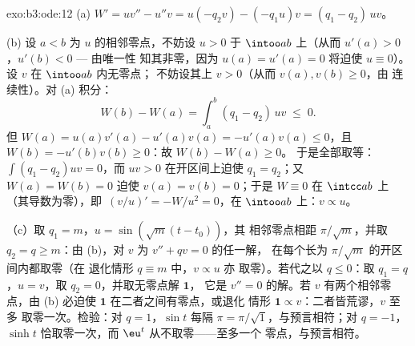 \begin{solution}{exo:b3:ode:12}
(a) $W' = uv'' - u''v = u(-q_2v) - (-q_1u)v = (q_1 -
q_2)\,uv$。

(b) 设 $a < b$ 为 $u$ 的相邻零点，不妨设 $u >
0$ 于 $\intoo ab$ 上（从而 $u'(a) > 0$，$u'(b) < 0$ --- 由唯一性
知其非零，因为 $u(a) = u'(a) = 0$ 将迫使 $u
\equiv 0$）。设 $v$ 在 $\intoo ab$ 内无零点；
不妨设其上 $v > 0$（从而 $v(a), v(b) \geq 0$，由
连续性）。对 (a) 积分：
\[
W(b) - W(a) = \int_a^b(q_1 - q_2)\,uv \;\leq\; 0 .
\]
但 $W(a) = u(a)v'(a) - u'(a)v(a) = -u'(a)v(a) \leq 0$，且
$W(b) = -u'(b)v(b) \geq 0$：故 $W(b) - W(a) \geq 0$。
于是全部取等：$\int(q_1 - q_2)uv = 0$，而 $uv > 0$
在开区间上迫使 $q_1 = q_2$；又 $W(a) =
W(b) = 0$ 迫使 $v(a) = v(b) = 0$；于是 $W \equiv 0$ 在
$\intcc ab$ 上（其导数为零），即\
$(v/u)' = -W/u^2 = 0$，在 $\intoo ab$ 上：$v \propto u$。

（c）取 $q_1 = m$，$u = \sin(\sqrt m(t - t_0))$，其
相邻零点相距 $\pi/\sqrt m$，并取 $q_2 = q \geq
m$：由 (b)，对 $v$ 为 $v'' + qv = 0$ 的任一解，
在每个长为 $\pi/\sqrt m$ 的开区间内都取零（在
退化情形 $q \equiv m$ 中，$v \propto u$ 亦
取零）。若代之以 $q \leq 0$：取 $q_1 = q$，$u =
v$，取 $q_2 = 0$，并取无零点解 $\mathbf 1$，
它是 $v'' = 0$ 的解。若 $v$ 有两个相邻零点，由 (b)
必迫使 $\mathbf 1$ 在二者之间有零点，或退化
情形 $\mathbf 1 \propto v$：二者皆荒谬，$v$ 至多
取零一次。检验：对 $q = 1$，$\sin t$ 每隔 $\pi
= \pi/\sqrt1$，与预言相符；对 $q = -1$，$\sinh t$
恰取零一次，而 $\eu^t$ 从不取零——至多一个
零点，与预言相符。
\end{solution}

